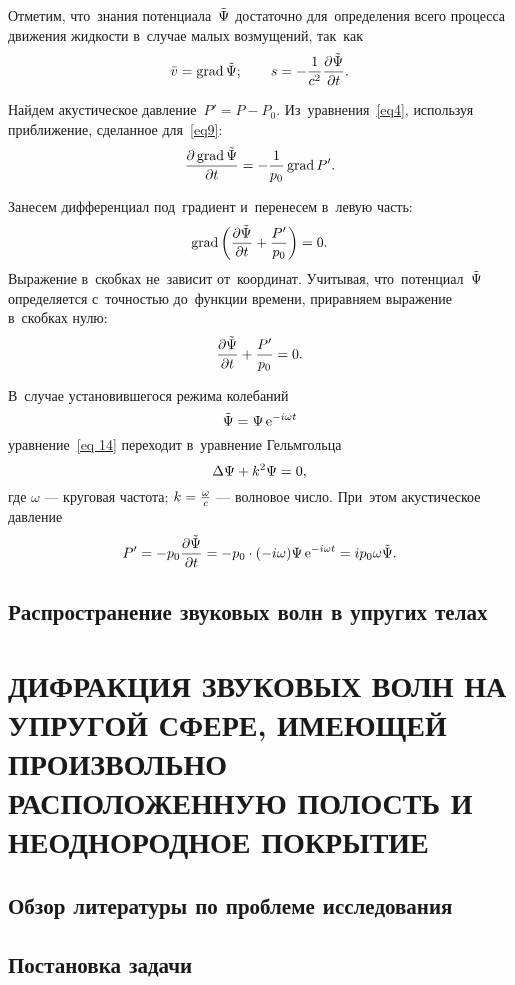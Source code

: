 Отметим, что~знания потенциала~$\tilde\P$ достаточно для~определения всего процесса движения жидкости в~случае малых возмущений, так~как
$$
\bar{v}=\grad\tilde\P;\qq s=-\fr{1}{c^2}\fr{\de\tilde\P}{\de t}.
$$

Найдем акустическое давление~$P'=P-P_0$. Из~уравнения~\eqref{eq4}, используя приближение, сделанное для~\eqref{eq9}:
$$
\fr{\de \grad \tilde\P}{\de t} = - \fr{1}{p_0}\grad P'.
$$

Занесем дифференциал под~градиент и~перенесем в~левую часть:
$$
\grad \left(\fr{\de \tilde\P}{\de t} + \fr{P'}{p_0}\right) = 0.
$$
Выражение в~скобках не~зависит от~координат. Учитывая, что~потенциал~$\tilde\P$ определяется с~точностью до~функции времени, приравняем выражение в~скобках нулю:
$$
\fr{\de \tilde\P}{\de t} + \fr{P'}{p_0} = 0.
$$

В~случае установившегося режима колебаний
\begin{equation}\label{eq 15}
\tilde\P=\P \e^{-i\omega t}
\end{equation}
уравнение~\eqref{eq 14} переходит в~уравнение Гельмгольца
\begin{equation}\label{eq 16}
\Lap{\P}+k^2\P=0,
\end{equation}
где $\omega$ --- круговая частота; $k=\fr{\omega}{c}$ --- волновое число.
При~этом акустическое давление 
$$
P'=-p_0 \fr{\de \tilde\P}{\de t}=-p_0 \cdot (-i \omega) \P \e^{-i\omega t}=ip_0\omega\tilde{\P}.
$$


\newpage
\subsection{Распространение звуковых волн в упругих телах}


\newpage
\section{ДИФРАКЦИЯ ЗВУКОВЫХ ВОЛН НА УПРУГОЙ СФЕРЕ, ИМЕЮЩЕЙ ПРОИЗВОЛЬНО РАСПОЛОЖЕННУЮ ПОЛОСТЬ И НЕОДНОРОДНОЕ ПОКРЫТИЕ}

\newpage
\subsection{Обзор литературы по проблеме исследования}

\newpage
\subsection{Постановка задачи}


